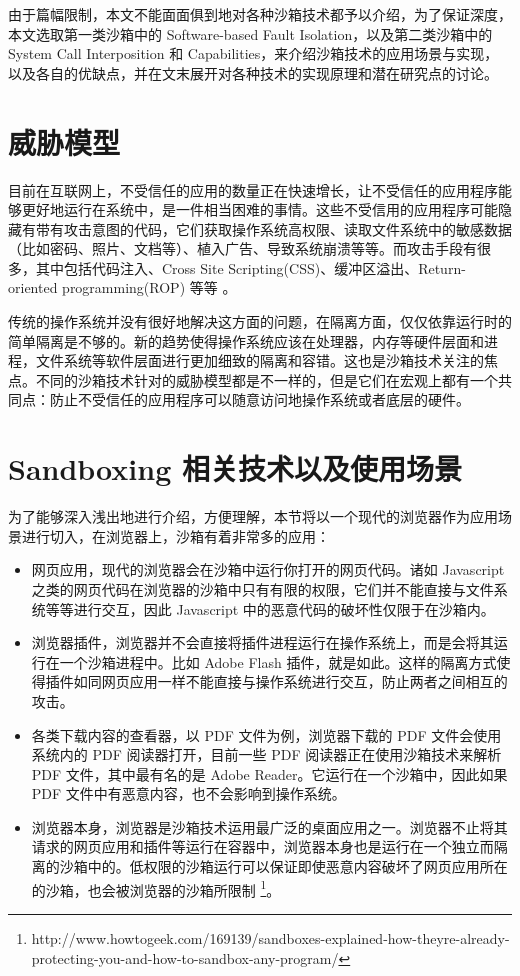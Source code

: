\documentclass[final,12pt]{elsarticle}
\begin{document}
由于篇幅限制，本文不能面面俱到地对各种沙箱技术都予以介绍，为了保证深度，本文选取第一类沙箱中的 Software-based Fault Isolation，以及第二类沙箱中的 System Call Interposition 和 Capabilities，来介绍沙箱技术的应用场景与实现，以及各自的优缺点，并在文末展开对各种技术的实现原理和潜在研究点的讨论。

\section{威胁模型}
\label{s:threat_model}

目前在互联网上，不受信任的应用的数量正在快速增长，让不受信任的应用程序能够更好地运行在系统中，是一件相当困难的事情。这些不受信用的应用程序可能隐藏有带有攻击意图的代码，它们获取操作系统高权限、读取文件系统中的敏感数据（比如密码、照片、文档等）、植入广告、导致系统崩溃等等。而攻击手段有很多，其中包括代码注入、Cross Site Scripting(CSS)、缓冲区溢出、Return-oriented programming(ROP) 等等 \cite{miwa}。	

传统的操作系统并没有很好地解决这方面的问题，在隔离方面，仅仅依靠运行时的简单隔离是不够的。新的趋势使得操作系统应该在处理器，内存等硬件层面和进程，文件系统等软件层面进行更加细致的隔离和容错。这也是沙箱技术关注的焦点。不同的沙箱技术针对的威胁模型都是不一样的，但是它们在宏观上都有一个共同点：防止不受信任的应用程序可以随意访问地操作系统或者底层的硬件。

\section{Sandboxing 相关技术以及使用场景}
\label{s:implementation}

为了能够深入浅出地进行介绍，方便理解，本节将以一个现代的浏览器作为应用场景进行切入，在浏览器上，沙箱有着非常多的应用：

\begin{itemize}
\item
网页应用，现代的浏览器会在沙箱中运行你打开的网页代码。诸如 Javascript 之类的网页代码在浏览器的沙箱中只有有限的权限，它们并不能直接与文件系统等等进行交互，因此 Javascript 中的恶意代码的破坏性仅限于在沙箱内。
\item
浏览器插件，浏览器并不会直接将插件进程运行在操作系统上，而是会将其运行在一个沙箱进程中。比如 Adobe Flash 插件，就是如此。这样的隔离方式使得插件如同网页应用一样不能直接与操作系统进行交互，防止两者之间相互的攻击。
\item
各类下载内容的查看器，以 PDF 文件为例，浏览器下载的 PDF 文件会使用系统内的 PDF 阅读器打开，目前一些 PDF 阅读器正在使用沙箱技术来解析 PDF 文件，其中最有名的是 Adobe Reader。它运行在一个沙箱中，因此如果 PDF 文件中有恶意内容，也不会影响到操作系统。
\item
浏览器本身，浏览器是沙箱技术运用最广泛的桌面应用之一。浏览器不止将其请求的网页应用和插件等运行在容器中，浏览器本身也是运行在一个独立而隔离的沙箱中的。低权限的沙箱运行可以保证即使恶意内容破坏了网页应用所在的沙箱，也会被浏览器的沙箱所限制 \footnote{http://www.howtogeek.com/169139/sandboxes-explained-how-theyre-already-protecting-you-and-how-to-sandbox-any-program/}。
\end{itemize}
\end{document}
